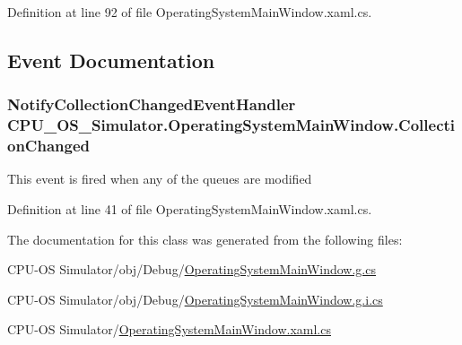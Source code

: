 Definition at line 92 of file Operating\+System\+Main\+Window.\+xaml.\+cs.



\subsection{Event Documentation}
\hypertarget{class_c_p_u___o_s___simulator_1_1_operating_system_main_window_af8aeaf0c83021caf8f735ea7c051848c}{}
\subsubsection[{Collection\+Changed}]{\setlength{\rightskip}{0pt plus 5cm}Notify\+Collection\+Changed\+Event\+Handler C\+P\+U\+\_\+\+O\+S\+\_\+\+Simulator.\+Operating\+System\+Main\+Window.\+Collection\+Changed}\label{class_c_p_u___o_s___simulator_1_1_operating_system_main_window_af8aeaf0c83021caf8f735ea7c051848c}


This event is fired when any of the queues are modified 



Definition at line 41 of file Operating\+System\+Main\+Window.\+xaml.\+cs.



The documentation for this class was generated from the following files\+:\begin{DoxyCompactItemize}
\item 
C\+P\+U-\/\+O\+S Simulator/obj/\+Debug/\hyperlink{_operating_system_main_window_8g_8cs}{Operating\+System\+Main\+Window.\+g.\+cs}\item 
C\+P\+U-\/\+O\+S Simulator/obj/\+Debug/\hyperlink{_operating_system_main_window_8g_8i_8cs}{Operating\+System\+Main\+Window.\+g.\+i.\+cs}\item 
C\+P\+U-\/\+O\+S Simulator/\hyperlink{_operating_system_main_window_8xaml_8cs}{Operating\+System\+Main\+Window.\+xaml.\+cs}\end{DoxyCompactItemize}
